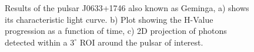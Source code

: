 \documentclass{PoS}
\begin{document}
\begin{figure}
\centering
{}
{}

\caption{Results of the pulsar J0633+1746 also known as Geminga, a)  shows its characteristic  light curve. b) Plot showing the H-Value progression as a function of time, c) 2D projection of photons detected within a $ 3^{\circ}$ ROI around the pulsar of interest.}\label{geminga}
\end{figure}
\end{document}
